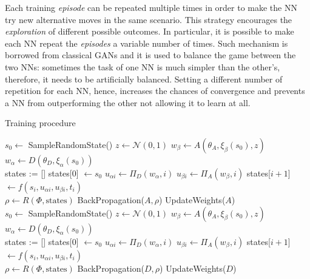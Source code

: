 Each training \textit{episode} can be repeated multiple times in order to make the NN try new alternative moves in the same scenario.
This strategy encourages the \textit{exploration} of different possible outcomes.
In particular, it is possible to make each NN repeat the \textit{episodes} a variable number of times.
Such mechanism is borrowed from classical GANs and it is used to balance the game between the two NNs: sometimes the task of one NN is much simpler than the other's, therefore, it needs to be artificially balanced.
Setting a different number of repetition for each NN, hence, increases the chances of convergence and prevents a NN from outperforming the other not allowing it to learn at all. 

\begin{algorithm}[H]
\caption{Training procedure}
\begin{algorithmic}[1]
    \State $s_0 \gets$ SampleRandomState()
     
        \State $z \gets \mathcal{N}(0,1)$
        \State $w_\beta \gets A(\theta_A, \xi_\beta(s_0), z)$
        \State $w_\alpha \gets D(\theta_D, \xi_\alpha(s_0))$
        \\
        \State states := [\:]
        \State states[$0$] $\gets s_0$
            \State $u_{\alpha i} \gets \Pi_D(w_\alpha, i)$
            \State $u_{\beta i} \gets \Pi_A(w_\beta, i)$
            \State states[$i+1$] $ \gets f(s_i, u_{\alpha i}, u_{\beta i}, t_i)$
        \EndFor
        \\
        \State $\rho \gets R(\Phi, \text{states})$ 
        \State BackPropagation($A, \rho$)
        \State UpdateWeights($A$)
    \EndFor
    \\
    \State $s_0 \gets$ SampleRandomState()
     
        \State $z \gets \mathcal{N}(0,1)$
        \State $w_\beta \gets A(\theta_A, \xi_\beta(s_0), z)$
        \State $w_\alpha \gets D(\theta_D, \xi_\alpha(s_0))$
        \\
        \State states := [\:]
        \State states[$0$] $\gets s_0$
            \State $u_{\alpha i} \gets \Pi_D(w_\alpha, i)$
            \State $u_{\beta i} \gets \Pi_A(w_\beta, i)$
            \State states[$i+1$] $ \gets f(s_i, u_{\alpha i}, u_{\beta i}, t_i)$
        \EndFor
        \\
        \State $\rho \gets R(\Phi, \text{states})$ 
        \State BackPropagation($D, \rho$)
        \State UpdateWeights($D$)
    \EndFor
\EndProcedure
\end{algorithmic}
\end{algorithm}


